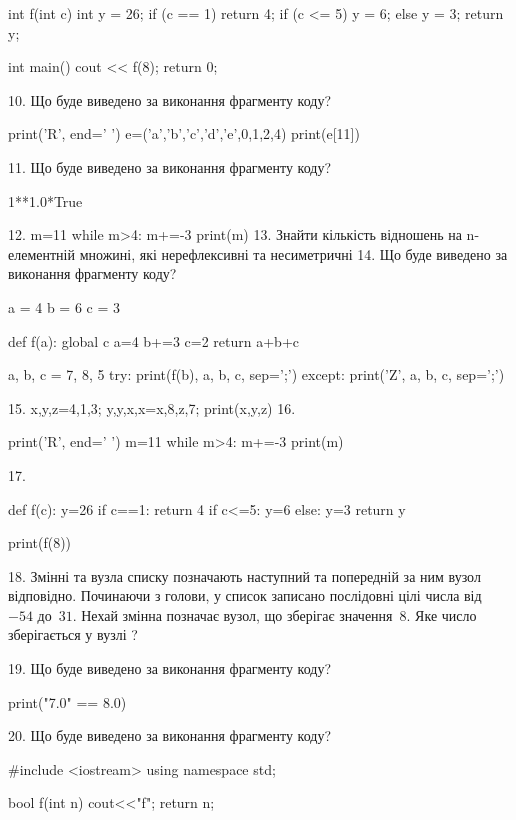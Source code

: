 \documentclass[11pt]{article}
\begin{document}
int f(int c){
    int y = 26;
    if (c == 1) 
        return 4;
    if (c <= 5)
         y = 6;
    else
         y = 3;
    return y;
}

int main(){
    cout << f(8);
    return 0;
}


10. Що буде виведено за виконання фрагменту коду?

print('R', end=' ')
e=('a','b','c','d','e',0,1,2,4)
print(e[11])


11. Що буде виведено за виконання фрагменту коду?

1**1.0*True

12. 
m=11
   while m>4: m+=-3
   print(m)
13. 
Знайти кількість відношень на n-елементній множині, які нерефлексивні та несиметричні
14. Що буде виведено за виконання фрагменту коду?

a = 4
b = 6
c = 3

def f(a):
global c    a=4
    b+=3
    c=2
    return a+b+c

a, b, c = 7, 8, 5
try:
    print(f(b), a, b, c, sep=';')
except:
    print('Z', a, b, c, sep=';')

15. 
x,y,z=4,1,3;  y,y,x,x=x,8,z,7;  print(x,y,z)
16. 

print('R', end=' ')
m=11
while m>4:
    m+=-3
print(m)


17. 

def f(c):
    y=26
    if c==1: 
        return 4
    if c<=5:
         y=6
    else:
         y=3
    return y

print(f(8))

18. 
Змінні  та  вузла списку позначають наступний та попередній за ним вузол відповідно. Починаючи з голови, у список записано послідовні цілі числа від~$-54$ до~$31$. Нехай змінна  позначає вузол, що зберігає значення~$8$.
Яке число зберігається у вузлі  ?

19. Що буде виведено за виконання фрагменту коду?

print("7.0" == 8.0)

20. Що буде виведено за виконання фрагменту коду?

#include <iostream>
using namespace std;

bool f(int n){
    cout<<"f";
    return n;
}
\end{document}
